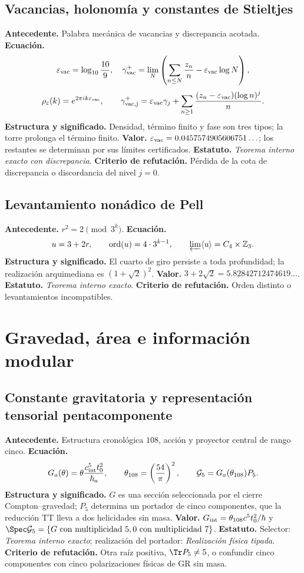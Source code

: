 \subsection*{Vacancias, holonom\'ia y constantes de Stieltjes }
\textbf{Antecedente.} Palabra mec\'anica de vacancias y discrepancia acotada.
\textbf{Ecuaci\'on.}
\[
\varepsilon_{\rm vac}=\log_{10}\frac{10}{9},\quad
\gamma_{\rm vac}^+=\lim_N\left(\sum_{n\le N}\frac{z_n}{n}
-\varepsilon_{\rm vac}\log N\right),
\]
\[
\rho_\varepsilon(k)=e^{2\pi ik\varepsilon_{\rm vac}},\qquad
\gamma_{\rm vac,j}^+=\varepsilon_{\rm vac}\gamma_j+
\sum_{n\ge1}\frac{(z_n-\varepsilon_{\rm vac})(\log n)^j}{n}.
\]
\textbf{Estructura y significado.} Densidad, t\'ermino finito y fase son tres
tipos; la torre prolonga el t\'ermino finito. \textbf{Valor.}
\(\varepsilon_{\rm vac}=0.0457574905606751\ldots\); los restantes se determinan
por sus l\'imites certificados. \textbf{Estatuto.} \emph{Teorema interno exacto con
discrepancia}. \textbf{Criterio de refutación.} P\'erdida de la cota de discrepancia o
discordancia del nivel \(j=0\).

\subsection*{Levantamiento non\'adico de Pell }
\textbf{Antecedente.} \(r^2=2\pmod{3^k}\). \textbf{Ecuaci\'on.}
\[
u=3+2r,\qquad \operatorname{ord}(u)=4\cdot3^{k-1},
\qquad \varprojlim\langle u\rangle=C_4\times\mathbb Z_3.
\]
\textbf{Estructura y significado.} El cuarto de giro persiste a toda
profundidad; la realizaci\'on arquimediana es \((1+\sqrt2)^2\).
\textbf{Valor.} \(3+2\sqrt2=5.82842712474619\ldots\).
\textbf{Estatuto.} \emph{Teorema interno exacto}. \textbf{Criterio de refutación.} Orden distinto
o levantamientos incompatibles.

\section{Gravedad, \'area e informaci\'on modular}

\subsection*{Constante gravitatoria y representaci\'on tensorial pentacomponente }
\textbf{Antecedente.} Estructura cronol\'ogica \(108\), acci\'on y proyector
central de rango
cinco. \textbf{Ecuaci\'on.}
\[
G_a(\theta)=\theta\frac{c_{\rm int}^5t_0^2}{\hbar_a},
\qquad \theta_{108}=\left(\frac{54}{\pi}\right)^2,
\qquad \mathcal G_5=G_a(\theta_{108})P_5.
\]
\textbf{Estructura y significado.} \(G\) es una secci\'on seleccionada por el
cierre Compton--gravedad; \(P_5\) determina un portador de cinco componentes,
que la reducci\'on TT lleva a dos helicidades sin masa.
\textbf{Valor.} \(G_{\rm int}=\theta_{108}c^5t_0^2/\hbar\) y
\(\Spec\mathcal G_5=\{G\text{ con multiplicidad }5,
0\text{ con multiplicidad }7\}\).
\textbf{Estatuto.} Selector: \emph{Teorema interno exacto}; realizaci\'on del portador:
\emph{Realizaci\'on f\'isica tipada}. \textbf{Criterio de refutación.} Otra ra\'iz positiva,
\(\Tr P_5\ne5\), o confundir cinco componentes con cinco polarizaciones
f\'isicas de GR sin masa.

